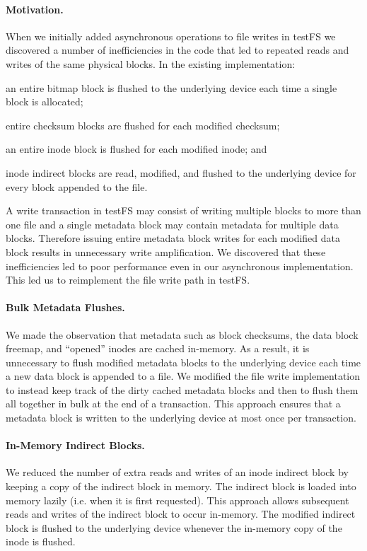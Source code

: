 \paragraph{Motivation.}
When we initially added asynchronous operations to file writes in testFS we
discovered a number of inefficiencies in the code that led to repeated reads
and writes of the same physical blocks. In the existing implementation:
\begin{enumerate*}[label={(\roman*)}]
  \item an entire bitmap block is flushed to the underlying device each time a
    single block is allocated;
  \item entire checksum blocks are flushed for each modified checksum;
  \item an entire inode block is flushed for each modified inode; and
  \item inode indirect blocks are read, modified, and flushed to the underlying
    device for every block appended to the file.
\end{enumerate*}

A write transaction in testFS may consist of writing multiple blocks to more
than one file and a single metadata block may contain metadata for multiple
data blocks. Therefore issuing entire metadata block writes for each modified
data block results in unnecessary write amplification.  We discovered that
these inefficiencies led to poor performance even in our asynchronous
implementation. This led us to reimplement the file write path in testFS.

\paragraph{Bulk Metadata Flushes.}
We made the observation that metadata such as block checksums, the data
block freemap, and ``opened'' inodes are cached in-memory. As a result, it is
unnecessary to flush modified metadata blocks to the underlying device each
time a new data block is appended to a file. We modified the file write
implementation to instead keep track of the dirty cached metadata blocks and
then to flush them all together in bulk at the end of a transaction. This
approach ensures that a metadata block is written to the underlying device at
most once per transaction.

\paragraph{In-Memory Indirect Blocks.}
We reduced the number of extra reads and writes of an inode indirect block by
keeping a copy of the indirect block in memory. The indirect block is loaded
into memory lazily (i.e. when it is first requested). This approach allows
subsequent reads and writes of the indirect block to occur in-memory. The
modified indirect block is flushed to the underlying device whenever the
in-memory copy of the inode is flushed.
